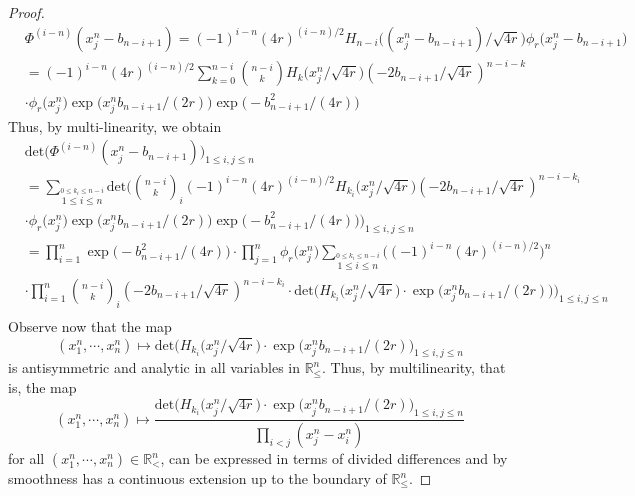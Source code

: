 \documentclass[11pt, reqno]{amsart}
\numberwithin{equation}{section}
\newcommand{\R}{\ensuremath{\mathbb{R}}}
\begin{document}
\begin{proof}
\begin{equation*}
    \begin{array}{cc}
         & \Phi^{(i-n)}(x^n_j-b_{n-i+1}) = (-1)^{i-n}(4r)^{(i-n)/2}H_{n-i}\big((x^n_j-b_{n-i+1})/\sqrt{4r}\big)\phi_{r}\big(x^n_j-b_{n-i+1}\big)\\
         & = (-1)^{i-n}(4r)^{(i-n)/2}\displaystyle\sum^{n-i}_{k=0}{\binom{n-i}{k}}H_{k}\big(x^n_j/\sqrt{4r}\big)\left(-2b_{n-i+1}/\sqrt{4r}\right)^{n-i-k}\\
         & \cdot \phi_{r}\big(x^n_j)\exp\big(x^n_j b_{n-i+1}/(2r)\big)\exp\big(-b_{n-i+1}^2/(4r)\big)
    \end{array}
\end{equation*}
Thus, by multi-linearity, we obtain
\begin{equation*}
    \begin{array}{cc}
        &\mathrm{det}\big(\Phi^{(i-n)}(x^n_j-b_{n-i+1})\big)_{1\le i, j\le n}\\
        & = \displaystyle\sum_{\stackrel{0\le k_i\le n-i}{1\le i \le n}} \mathrm{det}\bigg({\binom{n-i}{k}_i}(-1)^{i-n}(4r)^{(i-n)/2}H_{k_i}\big(x^n_j/\sqrt{4r}\big)\left(-2b_{n-i+1}/\sqrt{4r}\right)^{n-i-k_i}\\
         & \displaystyle\cdot \phi_{r}\big(x^n_j)\exp\big(x^n_j b_{n-i+1}/(2r)\big)\exp\big(-b_{n-i+1}^2/(4r)\big)\bigg)_{1\le i, j\le n}\\[2ex]
         & = \displaystyle\prod^n_{i=1}\exp\big(-b_{n-i+1}^2/(4r)\big)\cdot  \prod^n_{j=1}\phi_{r}\big(x^n_j)\displaystyle\sum_{\stackrel{0\le k_i\le n-i}{1\le i \le n}}\big((-1)^{i-n}(4r)^{(i-n)/2}\big)^n\\
         & \displaystyle\cdot \displaystyle\prod ^n_{i=1}{\binom{n-i}{k}_i}\left(-2b_{n-i+1}/\sqrt{4r}\right)^{n-i-k_i}\cdot \mathrm{det}\big(H_{k_i}\big(x^n_j/\sqrt{4r}\big)\cdot \exp\big(x^n_j b_{n-i+1}/(2r)\big)\big)_{1\le i, j\le n}\\
    \end{array}
\end{equation*}
Observe now that the map
\begin{equation*}
(x^n_1, \cdots, x^n_n)\mapsto \mathrm{det}\big(H_{k_i}\big(x^n_j/\sqrt{4r}\big)\cdot \exp\big(x^n_j b_{n-i+1}/(2r)\big)_{1\le i, j\le n}
\end{equation*}
is antisymmetric and analytic in all variables in $\R^n_{\le}$. Thus, by multilinearity, that is, the map
\begin{equation*}
    (x_1^n, \cdots, x^n_n)\mapsto \frac{\mathrm{det}\big(H_{k_i}\big(x^n_j/\sqrt{4r}\big)\cdot \exp\big(x^n_j b_{n-i+1}/(2r)\big)_{1\le i, j\le n}}{\displaystyle\prod_{i<j} (x^n_j-x^n_i) }
\end{equation*}
for all $(x_1^n, \cdots, x^n_n)\in \R^n_{<}$, can be expressed in terms of divided differences and by smoothness has a continuous extension up to the boundary of $\R^n_{\le}$.
\end{proof}
\end{document}
